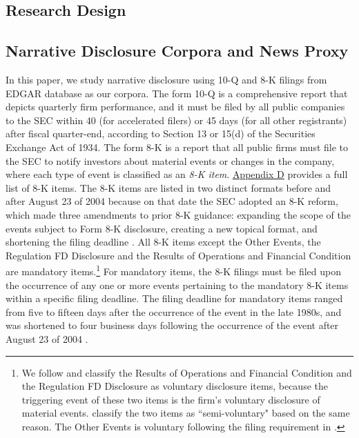 \documentclass[a4paper]{article}
\begin{document}
\begin{spacing}{2}
\begin{comment}
Aligned with the prior literature on the usefulness of conservatism, we argue that more complete, news-consistent and timely disclosure of bad news relative to good news enhances contract efficiency [specific hypotheses to be developed]. However, we do not make claims about the valuation role of narrative conservatism.

\end{comment}

\section{Research Design}
\subsection{Narrative Disclosure Corpora and News Proxy} \label{sec3.1}
In this paper, we study narrative disclosure using 10-Q and 8-K filings from EDGAR database as our corpora. The form 10-Q is a comprehensive report that depicts quarterly firm performance, and it must be filed by all public companies to the SEC within 40 (for accelerated filers) or 45 days (for all other registrants) after fiscal quarter-end, according to Section 13 or 15(d) of the Securities Exchange Act of 1934. The form 8-K is a report that all public firms must file to the SEC to notify investors about material events or changes in the company, where each type of event is classified as an \textit{8-K item}. \hyperref[appd]{Appendix D} provides a full list of 8-K items. The 8-K items are listed in two distinct formats before and after August 23 of 2004 because on that date the SEC adopted an 8-K reform, which made three amendments to prior 8-K guidance: expanding the scope of the events subject to Form 8-K disclosure, creating a new topical format, and shortening the filing deadline \cite{secFinalRuleAdditional2004, lermanNewForm8K2010}. All 8-K items except the Other Events, the Regulation FD Disclosure and the Results of Operations and Financial Condition are mandatory items.\footnote{We follow  and classify the Results of Operations and Financial Condition and the Regulation FD Disclosure as voluntary disclosure items, because the triggering event of these two items is the firm's voluntary disclosure of material events.  classify the two items as ``semi-voluntary" based on the same reason. The Other Events is voluntary following the filing requirement in . } For mandatory items, the 8-K filings must be filed upon the occurrence of any one or more events pertaining to the mandatory 8-K items within a specific filing deadline. The filing deadline for mandatory items ranged from five to fifteen days after the occurrence of the event in the late 1980s, and was shortened to four business days following the occurrence of the event after August 23 of 2004 \cite{lermanNewForm8K2010}.


\end{spacing}
\end{document}
